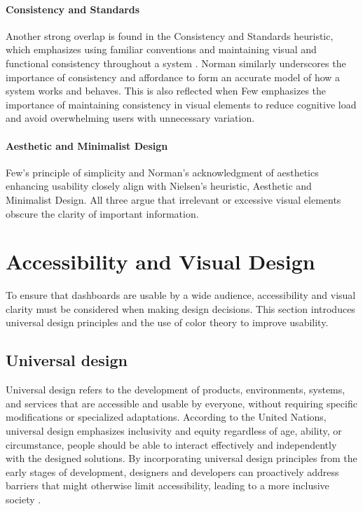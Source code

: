 \paragraph{Consistency and Standards}
\label{par:consistency_and_standards}


Another strong overlap is found in the Consistency and Standards heuristic, which emphasizes using familiar conventions and maintaining visual and functional consistency throughout a system \autocite{Nielsen1994}. Norman similarly underscores the importance of consistency and affordance to form an accurate model of how a system works and behaves. This is also reflected when Few emphasizes the importance of maintaining consistency in visual elements to reduce cognitive load and avoid overwhelming users with unnecessary variation. 

\paragraph{Aesthetic and Minimalist Design}
\label{par:aesthetic_and_minimalist_design}


Few's principle of simplicity and Norman's acknowledgment of aesthetics enhancing usability closely align with Nielsen's heuristic, Aesthetic and Minimalist Design. All three argue that irrelevant or excessive visual elements obscure the clarity of important information.

\section{Accessibility and Visual Design}

To ensure that dashboards are usable by a wide audience, accessibility and visual clarity must be considered when making design decisions. This section introduces universal design principles and the use of color theory to improve usability.


\subsection{Universal design}
\label{subsubsec:universal_design}

Universal design refers to the development of products, environments, systems, and services that are accessible and usable by everyone, without requiring specific modifications or specialized adaptations. According to the United Nations, universal design emphasizes inclusivity and equity regardless of age, ability, or circumstance, people should be able to interact effectively and independently with the designed solutions. By incorporating universal design principles from the early stages of development, designers and developers can proactively address barriers that might otherwise limit accessibility, leading to a more inclusive society \autocite{UN}.

